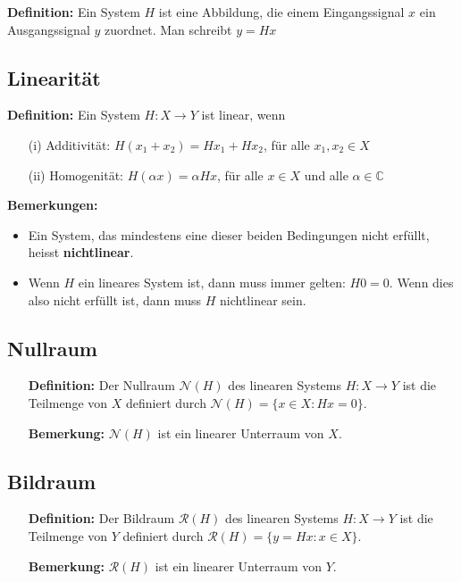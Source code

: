 \documentclass[11pt]{article}
\begin{document}
\textbf{Definition:} Ein System $H$ ist eine Abbildung, die einem Eingangssignal $x$ ein Ausgangssignal $y$ zuordnet. Man schreibt $y = Hx$

\subsection*{Linearität}
\vspace*{-0.5cm}
\textbf{Definition:} Ein System $H:X \to Y$ ist linear, wenn 
\vspace*{-0.5cm}
\begin{itemize}
    \item[(i)] Additivität: $H(x_1 + x_2) = Hx_1 + Hx_2$, für alle $x_1,x_2 \in X$
    \item[(ii)] Homogenität: $H(\alpha x) = \alpha H x$, für alle $x\in X$ und alle $\alpha \in \mathbb{C}$
\end{itemize}
\textbf{Bemerkungen:}
\vspace*{-0.5cm}
\begin{itemize}
    \item Ein System, das mindestens eine dieser beiden Bedingungen nicht erfüllt, heisst \textbf{nichtlinear}.
    \item Wenn $H$ ein lineares System ist, dann muss immer gelten: $H0 = 0$. Wenn dies also nicht erfüllt ist, dann muss $H$ nichtlinear sein.
\end{itemize}

\vfill \null
\pagebreak

\subsection*{Nullraum}
\vspace*{-0.5cm}
\begin{itemize}[leftmargin = 0pt]
    \item[] \textbf{Definition:} Der Nullraum $\mathcal{N}(H)$ des linearen Systems $H:X \to Y$ ist die Teilmenge von $X$ definiert durch $\mathcal{N}(H) = \{x \in X : Hx = 0\}$.
    \item[] \textbf{Bemerkung:} $\mathcal{N}(H)$ ist ein linearer Unterraum von $X$.
\end{itemize}

\subsection*{Bildraum}
\vspace*{-0.5cm}
\begin{itemize}[leftmargin = 0pt]
    \item[] \textbf{Definition:} Der Bildraum $\mathcal{R}(H)$ des linearen Systems $H:X \to Y$ ist die Teilmenge von $Y$ definiert durch $\mathcal{R}(H) = \{y =Hx : x \in X\}$.
    \item[] \textbf{Bemerkung:} $\mathcal{R}(H)$ ist ein linearer Unterraum von $Y$.
\end{itemize}
\end{document}
